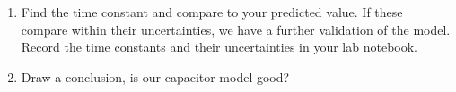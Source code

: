 \begin{enumerate}
	\item Find the time constant and compare to your predicted value. If these compare within their uncertainties, we have a further validation of the model. Record the time constants and their uncertainties in your lab notebook.

	\item Draw a conclusion, is our capacitor model good?
\end{enumerate}


\vspace*{\fill}
